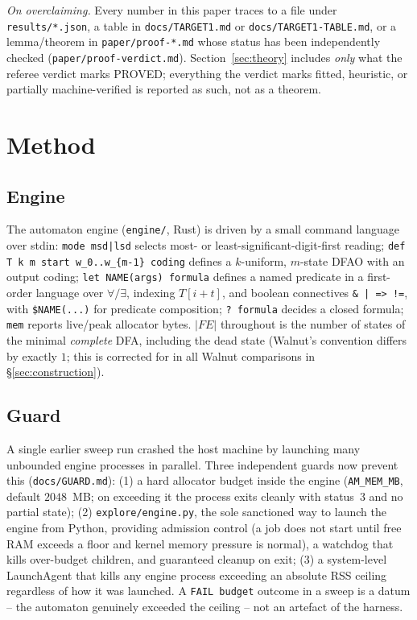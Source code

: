 \documentclass[11pt]{article}
\begin{document}
\emph{On overclaiming.} Every number in this paper traces to a file under
\texttt{results/*.json}, a table in \texttt{docs/TARGET1.md} or \texttt{docs/TARGET1-TABLE.md},
or a lemma/theorem in \texttt{paper/proof-*.md} whose status has been independently
checked (\texttt{paper/proof-verdict.md}). Section~\ref{sec:theory} includes \emph{only}
what the referee verdict marks PROVED; everything the verdict marks fitted, heuristic, or
partially machine-verified is reported as such, not as a theorem.

\section{Method}
\label{sec:method}

\subsection{Engine}
The automaton engine (\texttt{engine/}, Rust) is driven by a small command language over
stdin: \texttt{mode msd|lsd} selects most- or least-significant-digit-first reading;
\texttt{def T k m start w\_0..w\_\{m-1\} coding} defines a $k$-uniform, $m$-state DFAO
with an output coding; \texttt{let NAME(args) formula} defines a named predicate in a
first-order language over $\forall/\exists$, indexing $T[i+t]$, and boolean connectives
\texttt{\& | => !=}, with \texttt{\$NAME(...)} for predicate composition; \texttt{?
formula} decides a closed formula; \texttt{mem} reports live/peak allocator bytes.
$|FE|$ throughout is the number of states of the minimal \emph{complete} DFA, including
the dead state (Walnut's convention differs by exactly $1$; this is corrected for in all
Walnut comparisons in \S\ref{sec:construction}).

\subsection{Guard}
A single earlier sweep run crashed the host machine by launching many unbounded engine
processes in parallel. Three independent guards now prevent this (\texttt{docs/GUARD.md}):
(1) a hard allocator budget inside the engine (\texttt{AM\_MEM\_MB}, default $2048$~MB;
on exceeding it the process exits cleanly with status~3 and no partial state);
(2) \texttt{explore/engine.py}, the sole sanctioned way to launch the engine from Python,
providing admission control (a job does not start until free RAM exceeds a floor and
kernel memory pressure is normal), a watchdog that kills over-budget children, and
guaranteed cleanup on exit; (3) a system-level LaunchAgent that kills any engine process
exceeding an absolute RSS ceiling regardless of how it was launched. A \texttt{FAIL
budget} outcome in a sweep is a datum -- the automaton genuinely exceeded the ceiling --
not an artefact of the harness.
\end{document}
